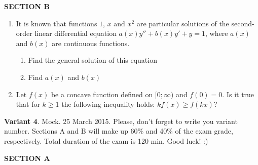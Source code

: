 \documentclass[12pt,a4paper]{article}
\begin{document}
\textbf{SECTION B}

\begin{enumerate}[resume]

\item It is known that functions $1$, $x$ and $x^2$  are particular solutions of the second-order linear differential equation  $a(x)y''+b(x)y'+y=1$,  where $a(x)$  and $b(x)$  are continuous functions.
\begin{enumerate}
\item  Find the general solution of this equation
\item  Find $a(x)$ and  $b(x)$
\end{enumerate}
\item Let $f(x)$ be a concave function defined on $[0;\infty)$  and $f(0)=0$. Is it true that for $k \geq 1$ the following inequality holds: $kf(x)\geq f(kx)$?


\end{enumerate}
\newpage

\thispagestyle{empty}
\textbf{Variant 4}. Mock. 25 March 2015. Please, don't forget to write you variant number. Sections A and B will make up 60\% and 40\% of the exam grade, respectively. Total duration of the exam is 120 min. Good luck! :) 



\textbf{SECTION A}
\end{document}
